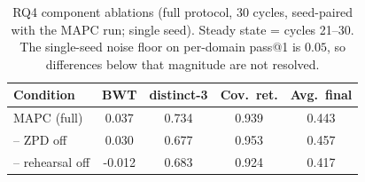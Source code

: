 \begin{table}[t]
\caption{RQ4 component ablations (full protocol, 30 cycles, seed-paired with the MAPC run; single seed). Steady state = cycles 21--30. The single-seed noise floor on per-domain pass@1 is $0.05$, so differences below that magnitude are not resolved.}
\label{tab:ablation}
\centering
\begin{tabular}{@{}lcccc@{}}
\toprule
Condition & BWT & distinct-3 & Cov.\ ret. & Avg.\ final \\
\midrule
MAPC (full) & 0.037 & 0.734 & 0.939 & 0.443 \\
\;-- ZPD off & 0.030 & 0.677 & 0.953 & 0.457 \\
\;-- rehearsal off & -0.012 & 0.683 & 0.924 & 0.417 \\
\bottomrule
\end{tabular}
\end{table}

